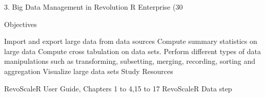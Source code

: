 
3. Big Data Management in Revolution R Enterprise (30%

Objectives

Import and export large data from data sources
Compute summary statistics on large data
Compute cross tabulation on data sets.
Perform different types of data manipulations such as transforming, subsetting, merging, recording, sorting and aggregation
Visualize large data sets
Study Resources

RevoScaleR User Guide, Chapters 1 to 4,15 to 17
RevoScaleR Data step
